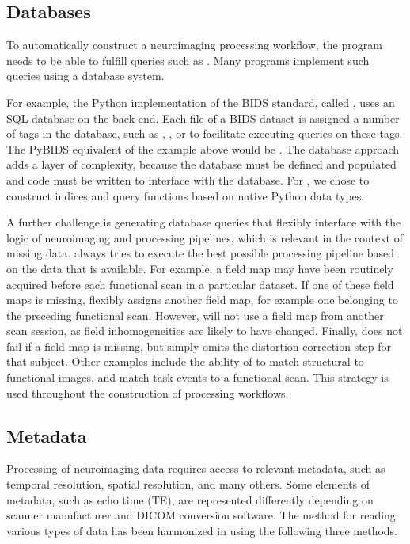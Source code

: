 \subsection{Databases}

To automatically construct a neuroimaging processing workflow, the program
needs to be able to fulfill queries such as . Many programs implement such queries using
a database system. 

For example, the Python implementation of the BIDS
standard, called , uses an SQL database on the back-end. Each
file of a BIDS dataset is assigned a number of tags in the database, such
as , , or  to facilitate executing
queries on these tags. The PyBIDS equivalent of the example above would be
. The database approach adds a
layer of complexity, because the database must be defined and populated and
code must be written to interface with the database. For ,
we chose to construct indices and query functions based on native Python
data types.

A further challenge is generating database queries that flexibly interface
with the logic of neuroimaging and processing pipelines, which is relevant
in the context of missing data.  always tries to execute the
best possible processing pipeline based on the data that is available. For
example, a field map may have been routinely acquired before each
functional scan in a particular dataset. If one of these field maps is
missing,  flexibly assigns another field map, for example
one belonging to the preceding functional scan. However, 
will not use a field map from another scan session, as field
inhomogeneities are likely to have changed. Finally,  does
not fail if a field map is missing, but simply omits the distortion
correction step for that subject. Other examples include the ability of
 to match structural to functional images, and match task
events to a functional scan. This strategy is used throughout the
construction of processing workflows.

\subsection{Metadata}

Processing of neuroimaging data requires access to relevant metadata, such
as temporal resolution, spatial resolution, and many others. Some elements
of metadata, such as echo time (TE), are represented differently depending
on scanner manufacturer and DICOM conversion software. The method for
reading various types of data has been harmonized in  using
the following three methods.


